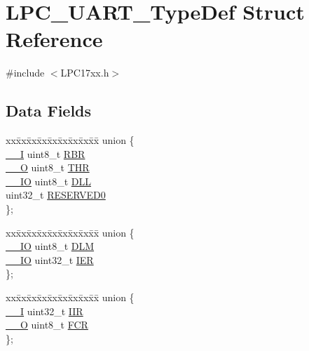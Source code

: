 \hypertarget{structLPC__UART__TypeDef}{}\section{L\+P\+C\+\_\+\+U\+A\+R\+T\+\_\+\+Type\+Def Struct Reference}
\label{structLPC__UART__TypeDef}


{\ttfamily \#include $<$L\+P\+C17xx.\+h$>$}

\subsection*{Data Fields}
\begin{DoxyCompactItemize}
\item 
\begin{tabbing}
xx\=xx\=xx\=xx\=xx\=xx\=xx\=xx\=xx\=\kill
union \{\\
\>\hyperlink{LPC17xx_8h_af63697ed9952cc71e1225efe205f6cd3}{\_\_I} uint8\_t \hyperlink{structLPC__UART__TypeDef_ada047e44cafc48942e2c094f11e422ce}{RBR}\\
\>\hyperlink{LPC17xx_8h_a7e25d9380f9ef903923964322e71f2f6}{\_\_O} uint8\_t \hyperlink{structLPC__UART__TypeDef_a5e587bae4b1f3a14cbdeec2e2a3e84a7}{THR}\\
\>\hyperlink{LPC17xx_8h_aec43007d9998a0a0e01faede4133d6be}{\_\_IO} uint8\_t \hyperlink{structLPC__UART__TypeDef_a49326fc2883951237f3c06ea41f5f3bf}{DLL}\\
\>uint32\_t \hyperlink{structLPC__UART__TypeDef_a83e56087b281e86c37a25efd473bad96}{RESERVED0}\\
\}; \\

\end{tabbing}\item 
\begin{tabbing}
xx\=xx\=xx\=xx\=xx\=xx\=xx\=xx\=xx\=\kill
union \{\\
\>\hyperlink{LPC17xx_8h_aec43007d9998a0a0e01faede4133d6be}{\_\_IO} uint8\_t \hyperlink{structLPC__UART__TypeDef_af8faf171fe8979361fb515e2eb230767}{DLM}\\
\>\hyperlink{LPC17xx_8h_aec43007d9998a0a0e01faede4133d6be}{\_\_IO} uint32\_t \hyperlink{structLPC__UART__TypeDef_afc1b84e9e3670126ce7bc52a44cf0315}{IER}\\
\}; \\

\end{tabbing}\item 
\begin{tabbing}
xx\=xx\=xx\=xx\=xx\=xx\=xx\=xx\=xx\=\kill
union \{\\
\>\hyperlink{LPC17xx_8h_af63697ed9952cc71e1225efe205f6cd3}{\_\_I} uint32\_t \hyperlink{structLPC__UART__TypeDef_a360b5c67d6e31dd5f6a9c6f3ad57b8a0}{IIR}\\
\>\hyperlink{LPC17xx_8h_a7e25d9380f9ef903923964322e71f2f6}{\_\_O} uint8\_t \hyperlink{structLPC__UART__TypeDef_ab64a3a7ef281715892c038fe97e89dbc}{FCR}\\
\}; \\


\end{tabbing}
\end{DoxyCompactItemize}
